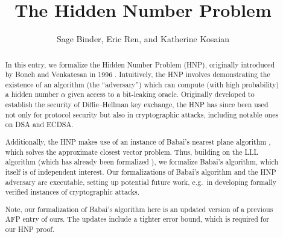 \documentclass[11pt,a4paper]{article}
\begin{document}
\title{The Hidden Number Problem}
\author{Sage Binder, Eric Ren, and Katherine Kosaian}
\maketitle

\begin{abstract}
In this entry, we formalize the Hidden Number Problem (HNP),
originally introduced by Boneh and Venkatesan in 1996 \cite{hnp}.
Intuitively,
the HNP involves demonstrating the existence
of an algorithm (the ``adversary'') which can compute
(with high probability) a hidden number $\alpha$
given access to a bit-leaking oracle.
Originally developed to establish the security of Diffie--Hellman key exchange,
the HNP has since been used not only for protocol security but also in cryptographic attacks,
including notable ones on DSA and ECDSA.

Additionally, the HNP makes use of an instance of Babai's nearest plane algorithm \cite{DBLP:journals/combinatorica/Babai86},
which solves the approximate closest vector problem.
Thus, building on the LLL algorithm \cite{LLL} (which has already been formalized \cite{LLL_Factorization-AFP,LLL_formalized_1,LLL_formalized_2}),
we formalize Babai's algorithm,
which itself is of independent interest.
Our formalizations of Babai's algorithm and the HNP adversary are executable,
setting up potential future work, e.g.\ in developing formally verified instances of cryptographic attacks.

Note, our formalization of Babai's algorithm here is an updated version of a previous AFP entry of ours.
The updates include a tighter error bound, which is required for our HNP proof.
\end{abstract}

\tableofcontents





\end{document}
